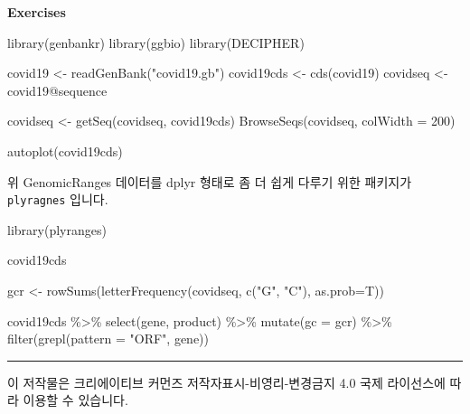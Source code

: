 \documentclass[
]{book}
\newenvironment{Shaded}{\begin{snugshade}}{\end{snugshade}}
\newcommand{\AttributeTok}[1]{\textcolor[rgb]{0.77,0.63,0.00}{#1}}
\newcommand{\DecValTok}[1]{\textcolor[rgb]{0.00,0.00,0.81}{#1}}
\newcommand{\FunctionTok}[1]{\textcolor[rgb]{0.00,0.00,0.00}{#1}}
\newcommand{\NormalTok}[1]{#1}
\newcommand{\OtherTok}[1]{\textcolor[rgb]{0.56,0.35,0.01}{#1}}
\newcommand{\SpecialCharTok}[1]{\textcolor[rgb]{0.00,0.00,0.00}{#1}}
\newcommand{\StringTok}[1]{\textcolor[rgb]{0.31,0.60,0.02}{#1}}
\begin{document}
\textbf{Exercises }

\begin{Shaded}
\begin{Highlighting}[]
\FunctionTok{library}\NormalTok{(genbankr)}
\FunctionTok{library}\NormalTok{(ggbio)}
\FunctionTok{library}\NormalTok{(DECIPHER)}

\NormalTok{covid19 }\OtherTok{\textless{}{-}} \FunctionTok{readGenBank}\NormalTok{(}\StringTok{"covid19.gb"}\NormalTok{)}
\NormalTok{covid19cds }\OtherTok{\textless{}{-}} \FunctionTok{cds}\NormalTok{(covid19)}
\NormalTok{covidseq }\OtherTok{\textless{}{-}}\NormalTok{ covid19}\SpecialCharTok{@}\NormalTok{sequence}

\NormalTok{covidseq }\OtherTok{\textless{}{-}} \FunctionTok{getSeq}\NormalTok{(covidseq, covid19cds)}
\FunctionTok{BrowseSeqs}\NormalTok{(covidseq, }\AttributeTok{colWidth =} \DecValTok{200}\NormalTok{)}

\FunctionTok{autoplot}\NormalTok{(covid19cds)}
\end{Highlighting}
\end{Shaded}

위 GenomicRanges 데이터를 dplyr 형태로 좀 더 쉽게 다루기 위한 패키지가 \texttt{plyragnes} 입니다.

\begin{Shaded}
\begin{Highlighting}[]
\FunctionTok{library}\NormalTok{(plyranges)}

\NormalTok{covid19cds}

\NormalTok{gcr }\OtherTok{\textless{}{-}} \FunctionTok{rowSums}\NormalTok{(}\FunctionTok{letterFrequency}\NormalTok{(covidseq, }\FunctionTok{c}\NormalTok{(}\StringTok{"G"}\NormalTok{, }\StringTok{"C"}\NormalTok{), }\AttributeTok{as.prob=}\NormalTok{T))}

\NormalTok{covid19cds }\SpecialCharTok{\%\textgreater{}\%} 
  \FunctionTok{select}\NormalTok{(gene, product) }\SpecialCharTok{\%\textgreater{}\%} 
  \FunctionTok{mutate}\NormalTok{(}\AttributeTok{gc =}\NormalTok{ gcr) }\SpecialCharTok{\%\textgreater{}\%}
  \FunctionTok{filter}\NormalTok{(}\FunctionTok{grepl}\NormalTok{(}\AttributeTok{pattern =} \StringTok{"ORF"}\NormalTok{, gene)) }
\end{Highlighting}
\end{Shaded}

\begin{center}\rule{0.5\linewidth}{0.5pt}\end{center}

이 저작물은 크리에이티브 커먼즈 저작자표시-비영리-변경금지 4.0 국제 라이선스에 따라 이용할 수 있습니다.

  
\end{document}
